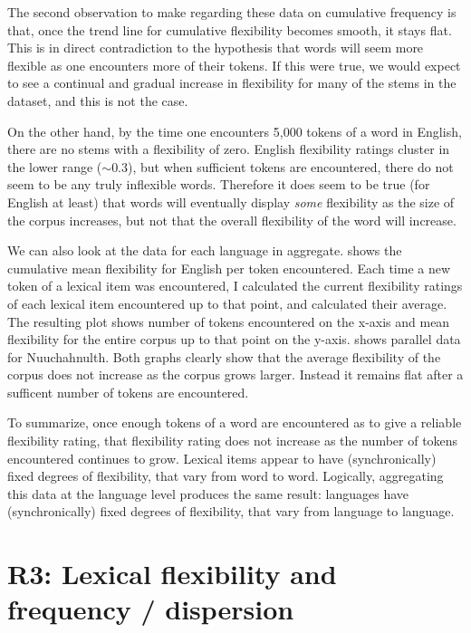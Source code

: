 The second observation to make regarding these data on cumulative frequency is that, once the trend line for cumulative flexibility becomes smooth, it stays flat. This is in direct contradiction to the hypothesis that words will seem more flexible as one encounters more of their tokens. If this were true, we would expect to see a continual and gradual increase in flexibility for many of the stems in the dataset, and this is not the case.

On the other hand, by the time one encounters 5,000 tokens of a word in English, there are no stems with a flexibility of zero. English flexibility ratings cluster in the lower range ($\sim0.3$), but when sufficient tokens are encountered, there do not seem to be any truly inflexible words. Therefore it does seem to be true (for English at least) that words will eventually display \emph{some} flexibility as the size of the corpus increases, but not that the overall flexibility of the word will increase.

We can also look at the data for each language in aggregate.  shows the cumulative mean flexibility for English per token encountered. Each time a new token of a lexical item was encountered, I calculated the current flexibility ratings of each lexical item encountered up to that point, and calculated their average. The resulting plot shows number of tokens encountered on the x-axis and mean flexibility for the entire corpus up to that point on the y-axis.  shows parallel data for Nuuchahnulth. Both graphs clearly show that the average flexibility of the corpus does not increase as the corpus grows larger. Instead it remains flat after a sufficent number of tokens are encountered.


To summarize, once enough tokens of a word are encountered as to give a reliable flexibility rating, that flexibility rating does not increase as the number of tokens encountered continues to grow. Lexical items appear to have (synchronically) fixed degrees of flexibility, that vary from word to word. Logically, aggregating this data at the language level produces the same result: languages have (synchronically) fixed degrees of flexibility, that vary from language to language.

\section{R3: Lexical flexibility and frequency / dispersion}
\label{sec:4.5}

